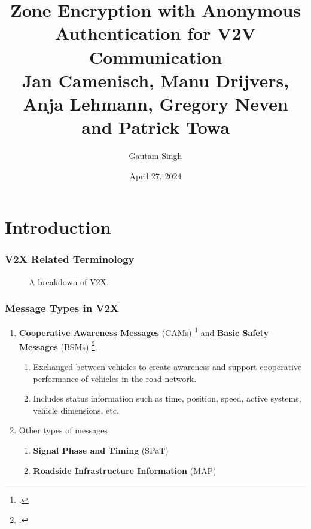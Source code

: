 \documentclass{beamer}
\title[Zone Encryption]{Zone Encryption with Anonymous Authentication for V2V
Communication \\
\small Jan Camenisch, Manu Drijvers, Anja Lehmann, Gregory Neven and Patrick
Towa}
\date{April 27, 2024}
\author{Gautam Singh}
\institute[IITH]{Indian Institute of Technology Hyderabad}
\begin{document}
    \maketitle
    \tableofcontents
    \section{Introduction}
    
    \begin{frame}
        \frametitle{V2X Related Terminology}
        \begin{figure}
            \centering
            \resizebox{.8\textwidth}{!}{}
            \caption{A breakdown of V2X.}
        \end{figure}
    \end{frame}

    \begin{frame}
        \frametitle{Message Types in V2X}
        \begin{enumerate}
            \item<1-> \textbf{Cooperative Awareness Messages} (CAMs)
            \footcite{etsi-en-302-637} and \textbf{Basic Safety Messages} (BSMs)
            \footcite{J2735_202309V2XCommunications}.
            \begin{enumerate}
                \item Exchanged between vehicles to create awareness and support
                cooperative performance of vehicles in the road network.
                \item Includes status information such as time, position, speed,
                active systems, vehicle dimensions, etc.
            \end{enumerate}
            \item<2-> Other types of messages
            \begin{enumerate}
                \item \textbf{Signal Phase and Timing} (SPaT)
                \item \textbf{Roadside Infrastructure Information} (MAP)
            \end{enumerate} 
        \end{enumerate}
    \end{frame}
\end{document}
